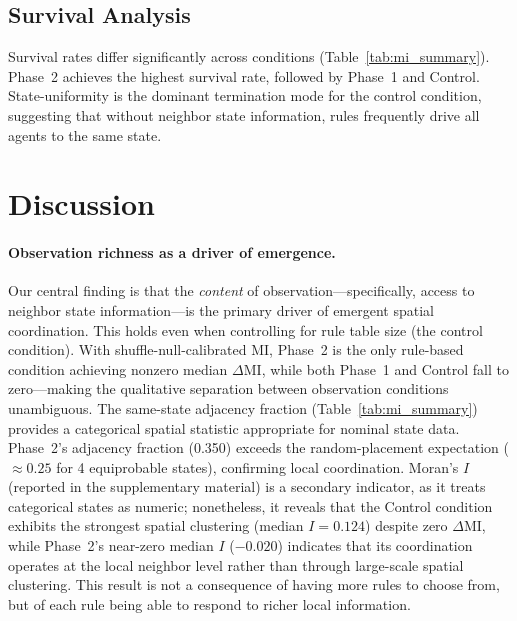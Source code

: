 \documentclass[letterpaper]{article}
\begin{document}
\subsection{Survival Analysis}

Survival rates differ significantly across conditions (Table~\ref{tab:mi_summary}).
Phase~2 achieves the highest survival rate, followed by Phase~1
and Control. State-uniformity is the dominant
termination mode for the control condition, suggesting that without neighbor
state information, rules frequently drive all agents to the same state.

\section{Discussion}

\paragraph{Observation richness as a driver of emergence.}
Our central finding is that the \emph{content} of observation---specifically,
access to neighbor state information---is the primary driver of emergent spatial
coordination. This holds even when controlling for rule table size (the control
condition). With shuffle-null-calibrated MI, Phase~2 is the
only rule-based condition achieving nonzero median $\Delta\mathrm{MI}$, while
both Phase~1 and Control fall to zero---making the qualitative separation
between observation conditions unambiguous.
The same-state adjacency fraction (Table~\ref{tab:mi_summary}) provides
a categorical spatial statistic appropriate for nominal state data.
Phase~2's adjacency fraction (0.350) exceeds the random-placement
expectation ($\approx 0.25$ for 4 equiprobable states), confirming
local coordination.  Moran's $I$ (reported in the supplementary
material) is a secondary indicator, as it treats categorical states as
numeric; nonetheless, it reveals that the Control condition exhibits the
strongest spatial clustering (median $I = 0.124$) despite zero $\Delta\mathrm{MI}$,
while Phase~2's near-zero median $I$ ($-0.020$) indicates that its
coordination operates at the local neighbor level rather than through
large-scale spatial clustering.
This result is not a consequence of having more rules to choose from, but of
each rule being able to respond to richer local information.
\end{document}
